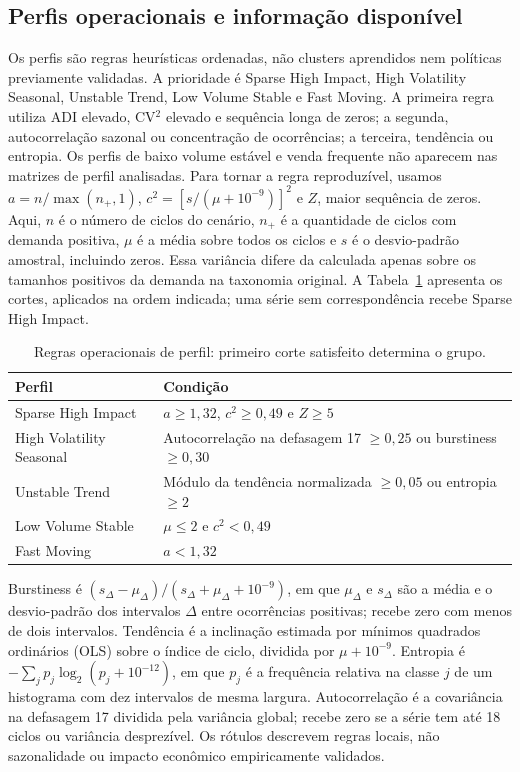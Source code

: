 \documentclass[preprint,12pt]{elsarticle}
\begin{document}
\subsection{Perfis operacionais e informação disponível}
Os perfis são regras heurísticas ordenadas, não clusters aprendidos nem políticas previamente validadas. A prioridade é Sparse High Impact, High Volatility Seasonal, Unstable Trend, Low Volume Stable e Fast Moving. A primeira regra utiliza ADI elevado, CV$^2$ elevado e sequência longa de zeros; a segunda, autocorrelação sazonal ou concentração de ocorrências; a terceira, tendência ou entropia. Os perfis de baixo volume estável e venda frequente não aparecem nas matrizes de perfil analisadas. Para tornar a regra reproduzível, usamos $a=n/\max(n_+,1)$, $c^2=[s/(\mu+10^{-9})]^2$ e $Z$, maior sequência de zeros. Aqui, $n$ é o número de ciclos do cenário, $n_+$ é a quantidade de ciclos com demanda positiva, $\mu$ é a média sobre todos os ciclos e $s$ é o desvio-padrão amostral, incluindo zeros. Essa variância difere da calculada apenas sobre os tamanhos positivos da demanda na taxonomia original. A Tabela~\ref{tab:profile_rules} apresenta os cortes, aplicados na ordem indicada; uma série sem correspondência recebe Sparse High Impact.

\begin{table}[htbp]\centering\small
\caption{Regras operacionais de perfil: primeiro corte satisfeito determina o grupo.}\label{tab:profile_rules}
\begin{tabular}{@{}p{3.7cm}p{7.2cm}@{}}\toprule
Perfil & Condição\\\midrule
Sparse High Impact & $a\geq1{,}32$, $c^2\geq0{,}49$ e $Z\geq5$\\
High Volatility Seasonal & Autocorrelação na defasagem 17 $\geq0{,}25$ ou burstiness $\geq0{,}30$\\
Unstable Trend & Módulo da tendência normalizada $\geq0{,}05$ ou entropia $\geq2$\\
Low Volume Stable & $\mu\leq2$ e $c^2<0{,}49$\\
Fast Moving & $a<1{,}32$\\\bottomrule\end{tabular}\end{table}

Burstiness é $(s_\Delta-\mu_\Delta)/(s_\Delta+\mu_\Delta+10^{-9})$, em que $\mu_\Delta$ e $s_\Delta$ são a média e o desvio-padrão dos intervalos $\Delta$ entre ocorrências positivas; recebe zero com menos de dois intervalos. Tendência é a inclinação estimada por mínimos quadrados ordinários (OLS) sobre o índice de ciclo, dividida por $\mu+10^{-9}$. Entropia é $-\sum_j p_j\log_2(p_j+10^{-12})$, em que $p_j$ é a frequência relativa na classe $j$ de um histograma com dez intervalos de mesma largura. Autocorrelação é a covariância na defasagem 17 dividida pela variância global; recebe zero se a série tem até 18 ciclos ou variância desprezível. Os rótulos descrevem regras locais, não sazonalidade ou impacto econômico empiricamente validados.
\end{document}
